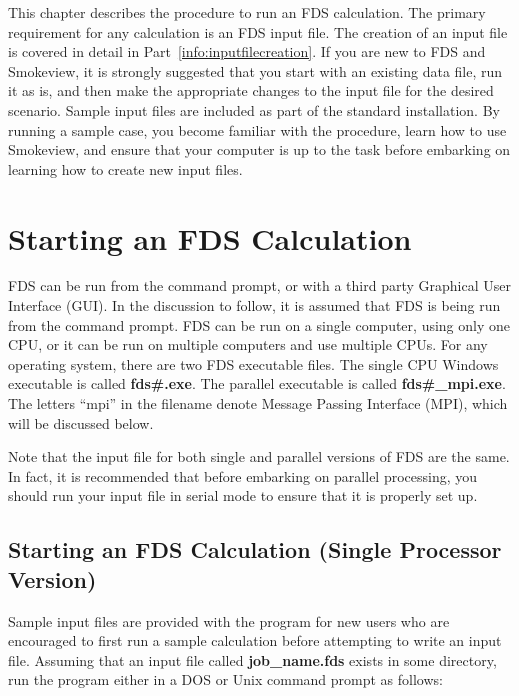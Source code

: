 \documentclass[11pt]{book}
\begin{document}
This chapter describes the procedure to run an FDS calculation.
The primary requirement for any calculation is an FDS input file. The creation of an
input file is covered in detail in Part~\ref{info:inputfilecreation}.
If you are new to FDS and Smokeview, it is strongly suggested that you start with an existing data file, run it as is,
and then make the appropriate changes to the input file for the
desired scenario. Sample input files are included as part of the standard installation.
By running a sample case, you become
familiar with the procedure, learn how to use Smokeview, and
ensure that your computer is up to the task before embarking on
learning how to create new input files.

\section{Starting an FDS Calculation}

FDS can be run from the command prompt, or with a third party Graphical User Interface (GUI).
In the discussion to follow, it is assumed that FDS is being run from the command prompt.
FDS can be run on a single computer, using only one CPU, or it can be run on multiple
computers and use multiple CPUs. For any operating system, there are two FDS executable files.
The single CPU Windows executable is called {\bf fds\#.exe}.
The parallel executable is called {\bf fds\#\_mpi.exe}. The letters ``mpi'' in the filename denote
Message Passing Interface (MPI), which will be discussed below.

\begin{warning}
\noindent
Note that the input file for both single and parallel versions of FDS are the same.
In fact, it is recommended that before embarking on parallel processing, you should run your input
file in serial mode to ensure that it is properly set up.
\end{warning}


\subsection{Starting an FDS Calculation (Single Processor Version)}

Sample input files are provided with the program for new users who
are encouraged to first run a sample calculation before attempting to
write an input file. Assuming that an input file called {\bf job\_name.fds}
exists in some directory, run the program either in a DOS or Unix command prompt as follows:
\end{document}
